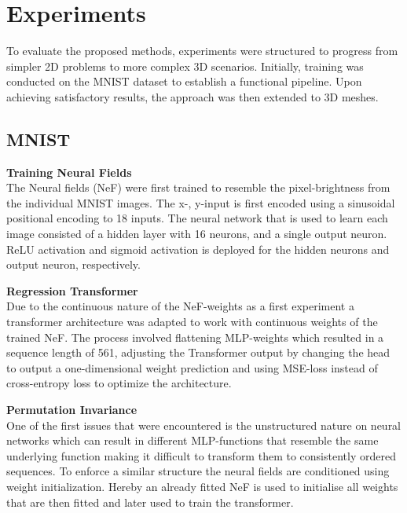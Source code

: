 \section{Experiments}
\label{sec:exper}
To evaluate the proposed methods, experiments were structured to progress from simpler 2D problems to more complex 3D scenarios. Initially, training was conducted on the MNIST dataset to establish a functional pipeline. Upon achieving satisfactory results, the approach was then extended to 3D meshes.

\subsection*{MNIST }
\textbf{Training Neural Fields}\\
The Neural fields (NeF) were first trained to resemble the pixel-brightness from the individual MNIST images. The x-, y-input is first encoded using a sinusoidal positional encoding to 18 inputs. The neural network that is used to learn each image consisted of a hidden layer with 16 neurons, and a single output neuron. ReLU activation and sigmoid activation is deployed for the hidden neurons and output neuron, respectively.
\vspace{1em}

\noindent
\textbf{Regression Transformer }\\
Due to the continuous nature of the NeF-weights as a first experiment a transformer architecture was adapted to work with continuous weights of the trained NeF. The process involved flattening MLP-weights which resulted in a sequence length of 561, adjusting the Transformer output by changing the head to output a one-dimensional weight prediction and using MSE-loss instead of cross-entropy loss to optimize the architecture.
\vspace{1em}

\noindent
\textbf{Permutation Invariance}\\
One of the first issues that were encountered is the unstructured nature on neural networks which can result in different MLP-functions that resemble the same underlying function \cite{HechtNielsen1990ONTA} making it difficult to transform them to consistently ordered sequences. To enforce a similar structure the neural fields are conditioned using weight initialization. Hereby an already fitted NeF is used to initialise all weights that are then fitted and later used to train the transformer.
\vspace{1em}

